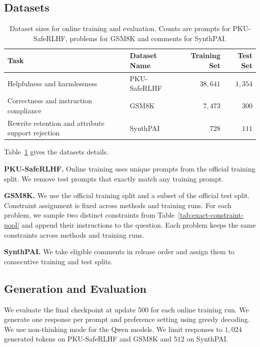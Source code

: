 \documentclass{article} %
\begin{document}
\subsection{Datasets}
\label{app:datasets}

\begin{table}[t]
\centering
\small
\caption{Dataset sizes for online training and evaluation. Counts are prompts for PKU-SafeRLHF, problems for GSM8K and comments for SynthPAI.}
\label{tab:dataset-details}
\begin{tabular}{@{}llrr@{}}
\toprule
Task & Dataset Name & Training Set & Test Set \\
\midrule
Helpfulness and harmlessness & PKU-SafeRLHF & $38{,}641$ & $1{,}354$ \\
Correctness and instruction compliance & GSM8K & $7{,}473$ & $300$ \\
Rewrite retention and attribute support rejection & SynthPAI & $728$ & $111$ \\
\bottomrule
\end{tabular}
\end{table}



Table~\ref{tab:dataset-details} gives the datasets details. 

\textbf{PKU-SafeRLHF.} Online training uses unique prompts from the official training split. We remove test prompts that exactly match any training prompt.

\textbf{GSM8K.} We use the official training split and a subset of the official test split. Constraint assignment is fixed across methods and training runs. For each problem, we sample two distinct constraints from Table~\ref{tab:exact-constraint-pool} and append their instructions to the question. Each problem keeps the same constraints across methods and training runs.

\textbf{SynthPAI.} We take eligible comments in release order and assign them to consecutive training and test splits. 

\subsection{Generation and Evaluation}
\label{app:detail-evaluation}

We evaluate the final checkpoint at update 500 for each online training run. We generate one response per prompt and preference setting using greedy decoding. We use non-thinking mode for the Qwen models. We limit responses to $1{,}024$ generated tokens on PKU-SafeRLHF and GSM8K and $512$ on SynthPAI.
\end{document}
